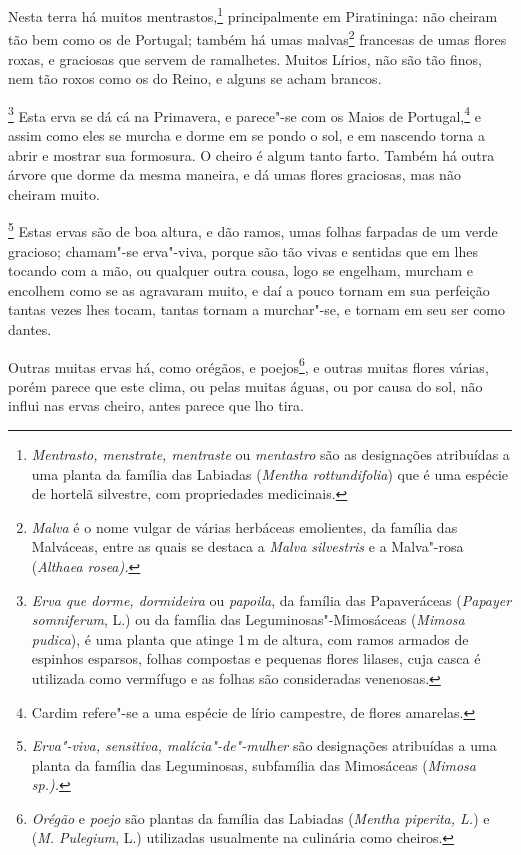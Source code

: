 Nesta terra há muitos mentrastos,\footnote{ \textit{Mentrasto,
menstrate, mentraste} ou \textit{mentastro} são as designações
atribuídas a uma planta da família das Labiadas (\textit{Mentha
rottundifolia}) que é uma espécie de hortelã silvestre, com
propriedades medicinais.} principalmente em Piratininga: não cheiram
tão bem como os de Portugal; também há umas malvas\footnote{ \textit{Malva} 
é o nome vulgar de várias herbáceas emolientes, da
família das Malváceas, entre as quais se destaca a \textit{Malva
silvestris} e a Malva"-rosa (\textit{Althaea rosea).}} francesas de umas
flores roxas, e graciosas que servem de ramalhetes. Muitos Lírios, não
são tão finos, nem tão roxos como os do Reino, e alguns se acham brancos.

\footnote{ \textit{Erva que dorme, dormideira}
ou \textit{papoila}, da família das Papaveráceas (\textit{Papayer
somniferum}, L.) ou da família das Leguminosas"-Mimosáceas
(\textit{Mimosa pudica}), é uma planta que atinge 1\,m de altura, com
ramos armados de espinhos esparsos, folhas compostas e pequenas flores
lilases, cuja casca é utilizada como vermífugo e as folhas são
consideradas venenosas.} Esta erva se dá cá na Primavera, e
parece"-se com os Maios de Portugal,\footnote{ Cardim refere"-se a uma
espécie de lírio campestre, de flores amarelas.} e assim como eles se
murcha e dorme em se pondo o sol, e em nascendo torna a abrir e mostrar
sua formosura. O cheiro é algum tanto farto. Também há outra árvore que
dorme da mesma maneira, e dá umas flores graciosas, mas não cheiram muito.

\footnote{ \textit{Erva"-viva, sensitiva,
malícia"-de"-mulher} são designações atribuídas a uma planta da família 
das Leguminosas, subfamília das Mimosáceas (\textit{Mimosa
sp.).}} Estas ervas são de boa altura, e dão ramos, umas
folhas farpadas de um verde gracioso; chamam"-se erva"-viva, porque são
tão vivas e sentidas que em lhes tocando com a mão, ou qualquer outra
cousa, logo se engelham, murcham e encolhem como se as agravaram muito,
e daí a pouco tornam em sua perfeição tantas vezes lhes tocam, tantas
tornam a murchar"-se, e tornam em seu ser como dantes.

 Outras muitas ervas há, como orégãos, e poejos\footnote{ \textit{Orégão} 
e \textit{poejo} são plantas da família das Labiadas
(\textit{Mentha piperita, L.}) e (\textit{M. Pulegium}, L.) utilizadas
usualmente na culinária como cheiros.}, e outras muitas flores várias,
porém parece que este clima, ou pelas muitas águas, ou por causa do
sol, não influi nas ervas cheiro, antes parece que lho tira.

